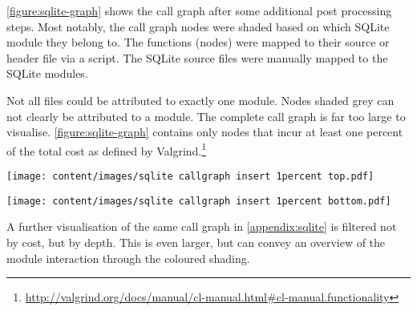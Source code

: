 \autoref{figure:sqlite-graph} shows the call graph after some additional post processing steps.\label{ID_1171772600}
Most notably, the call graph nodes were shaded based on which SQLite module they belong to.\label{ID_35615895}
The functions (nodes) were mapped to their source or header file via a script.\label{ID_1298856493}
The SQLite source files were manually mapped to the SQLite modules.\label{ID_1924456824}

Not all files could be attributed to exactly one module. Nodes shaded grey can not clearly be attributed to a module.\label{ID_91919687}
The complete call graph is far too large to visualise.\label{ID_1793749005}
\autoref{figure:sqlite-graph} contains only nodes that incur at least one percent of the total cost as defined by Valgrind.\footnote{\url{http://valgrind.org/docs/manual/cl-manual.html\#cl-manual.functionality}}\label{ID_200258758}
\begin{sidewaysfigure}\begin{leftfullpage}\texttt{[image: content/images/sqlite callgraph insert 1percent top.pdf]}
\caption{
\textbf{SQLite call graph for insert statement (top half).}\label{ID_450711429}
\label{figure:sqlite-graph}}\end{leftfullpage}\end{sidewaysfigure}
\begin{sidewaysfigure}\begin{fullpage}\ContinuedFloat\texttt{[image: content/images/sqlite callgraph insert 1percent bottom.pdf]}
\caption{
\textbf{SQLite call graph for insert statement (bottom half).}\label{ID_1189342130}
Only function calls (nodes) with a Valgrind cost greater than 1 percent are shown.\label{ID_1717360834}
Nodes are shaded according to the SQLite module they belong to (see the legend).\label{ID_991757666}
The modules are distinguished by the header or code file the function is defined in. The file is given in brackets.\label{ID_189828888}
}\end{fullpage}
\end{sidewaysfigure}
A further visualisation of the same call graph in \autoref{appendix:sqlite} is filtered not by cost, but by depth.\label{ID_489671835}
This is even larger, but can convey an overview of the module interaction through the coloured shading.\label{ID_1179349774}

